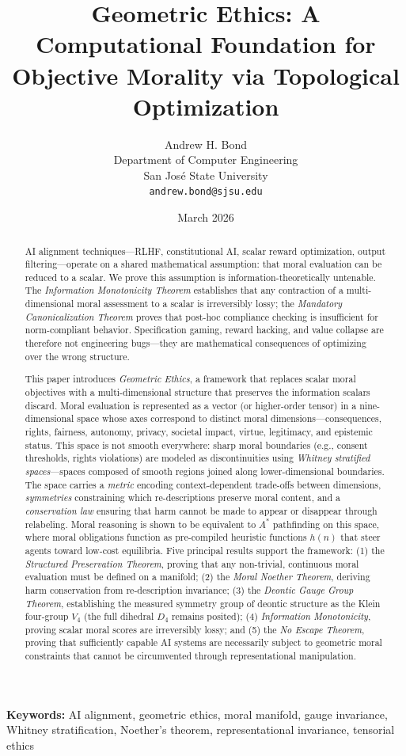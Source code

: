 \documentclass[12pt,letterpaper]{article}
\title{\textbf{Geometric Ethics: A Computational Foundation for\\Objective Morality via Topological Optimization}}
\author{Andrew H. Bond\\
Department of Computer Engineering\\
San Jos\'{e} State University\\
\texttt{andrew.bond@sjsu.edu}}
\date{March 2026}
\theoremstyle{definition}
\theoremstyle{remark}
\begin{document}
\maketitle

\noindent\textbf{Keywords:} AI alignment, geometric ethics, moral manifold, gauge invariance, Whitney stratification, Noether's theorem, representational invariance, tensorial ethics

\begin{abstract}
AI alignment techniques---RLHF, constitutional AI, scalar reward optimization, output filtering---operate on a shared mathematical assumption: that moral evaluation can be reduced to a scalar. We prove this assumption is information-theoretically untenable. The \emph{Information Monotonicity Theorem} establishes that any contraction of a multi-dimensional moral assessment to a scalar is irreversibly lossy; the \emph{Mandatory Canonicalization Theorem} proves that post-hoc compliance checking is insufficient for norm-compliant behavior. Specification gaming, reward hacking, and value collapse are therefore not engineering bugs---they are mathematical consequences of optimizing over the wrong structure.

This paper introduces \emph{Geometric Ethics}, a framework that replaces scalar moral objectives with a multi-dimensional structure that preserves the information scalars discard. Moral evaluation is represented as a vector (or higher-order tensor) in a nine-dimensional space whose axes correspond to distinct moral dimensions---consequences, rights, fairness, autonomy, privacy, societal impact, virtue, legitimacy, and epistemic status. This space is not smooth everywhere: sharp moral boundaries (e.g., consent thresholds, rights violations) are modeled as discontinuities using \emph{Whitney stratified spaces}---spaces composed of smooth regions joined along lower-dimensional boundaries. The space carries a \emph{metric} encoding context-dependent trade-offs between dimensions, \emph{symmetries} constraining which re-descriptions preserve moral content, and a \emph{conservation law} ensuring that harm cannot be made to appear or disappear through relabeling. Moral reasoning is shown to be equivalent to $A^*$ pathfinding on this space, where moral obligations function as pre-compiled heuristic functions $h(n)$ that steer agents toward low-cost equilibria. Five principal results support the framework: (1) the \emph{Structured Preservation Theorem}, proving that any non-trivial, continuous moral evaluation must be defined on a manifold; (2) the \emph{Moral Noether Theorem}, deriving harm conservation from re-description invariance; (3) the \emph{Deontic Gauge Group Theorem}, establishing the measured symmetry group of deontic structure as the Klein four-group $V_4$ (the full dihedral $D_4$ remains posited); (4) \emph{Information Monotonicity}, proving scalar moral scores are irreversibly lossy; and (5) the \emph{No Escape Theorem}, proving that sufficiently capable AI systems are necessarily subject to geometric moral constraints that cannot be circumvented through representational manipulation.


\end{abstract}
\end{document}
